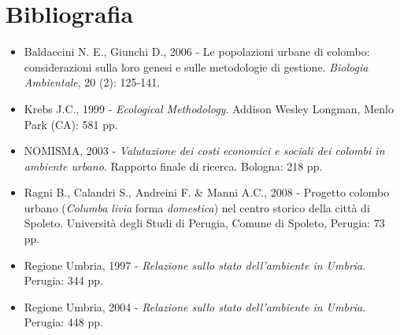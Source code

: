 \section*{Bibliografia}
\begin{itemize}\itemsep0pt
	\item \textcolor[rgb]{0.13725491,0.12156863,0.1254902}{Baldaccini N. E.,
Giunchi D., }\textcolor[rgb]{0.13725491,0.12156863,0.1254902}{2006 - 
}\textcolor[rgb]{0.13725491,0.12156863,0.1254902}{Le popolazioni urbane
di colombo: considerazioni sulla loro genesi e sulle metodologie di
gestione. }\textit{Biologia Ambientale}, 20 (2): 125-141. 

	\item Krebs J.C., 1999 - \textit{Ecological Methodology}. Addison Wesley
Longman, Menlo Park (CA): 581 pp.

	\item NOMISMA, 2003 - \textit{Valutazione dei costi economici e sociali dei
colombi in ambiente urbano}. Rapporto finale di ricerca. Bologna: 218
pp.

	\item Ragni B., Calandri S., Andreini F. \& Manni A.C., 2008 - Progetto
colombo urbano (\textit{Columba livia} forma \textit{domestica}) nel
centro storico della citt\`a di Spoleto. Universit\`a degli Studi di
Perugia, Comune di Spoleto, Perugia: 73 pp.

	\item Regione Umbria, 1997 - \textit{Relazione sullo stato
dell{\textquoteright}ambiente in Umbria}. Perugia: 344 pp.

	\item Regione Umbria,  2004 - \textit{Relazione sullo stato
dell{\textquoteright}ambiente in Umbria}. Perugia: 448 pp.
\end{itemize}